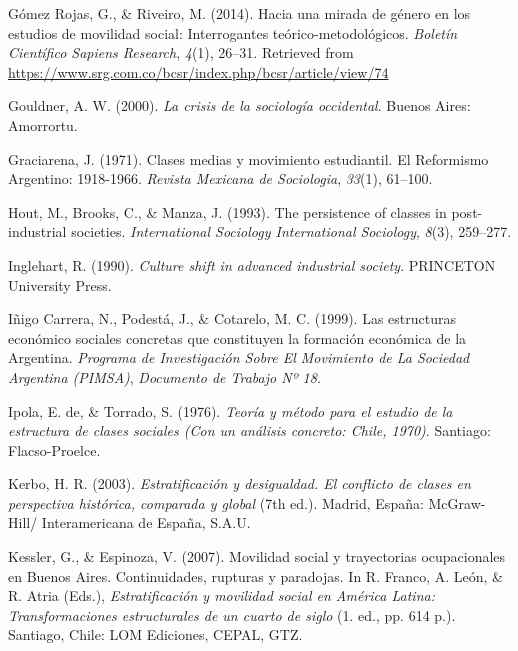 \documentclass[
]{article}
\newlength{\cslhangindent}
\newlength{\cslentryspacingunit} %
\newenvironment{CSLReferences}[2] %
 {%
  \setlength{\parindent}{0pt}
  \ifodd #1
  \let\oldpar\par
  \def\par{\hangindent=\cslhangindent\oldpar}
  \fi
  \setlength{\parskip}{#2\cslentryspacingunit}
 }%
 {}
\begin{document}
\begin{CSLReferences}{1}{0}
\leavevmode{}%
Gómez Rojas, G., \& Riveiro, M. (2014). Hacia una mirada de género en los estudios de movilidad social: Interrogantes teórico-metodológicos. \emph{Boletín Científico Sapiens Research}, \emph{4}(1), 26--31. Retrieved from \url{https://www.srg.com.co/bcsr/index.php/bcsr/article/view/74}

\leavevmode{}%
Gouldner, A. W. (2000). \emph{La crisis de la sociología occidental}. Buenos Aires: Amorrortu.

\leavevmode{}%
Graciarena, J. (1971). Clases medias y movimiento estudiantil. {El} {Reformismo} {Argentino}: 1918-1966. \emph{Revista Mexicana de Sociologia}, \emph{33}(1), 61--100.

\leavevmode{}%
Hout, M., Brooks, C., \& Manza, J. (1993). The persistence of classes in post-industrial societies. \emph{International Sociology International Sociology}, \emph{8}(3), 259--277.

\leavevmode{}%
Inglehart, R. (1990). \emph{Culture shift in advanced industrial society}. PRINCETON University Press.

\leavevmode{}%
Iñigo Carrera, N., Podestá, J., \& Cotarelo, M. C. (1999). Las estructuras económico sociales concretas que constituyen la formación económica de la {Argentina}. \emph{Programa de Investigación Sobre El Movimiento de La Sociedad Argentina (PIMSA)}, \emph{Documento de Trabajo Nº 18}.

\leavevmode{}%
Ipola, E. de, \& Torrado, S. (1976). \emph{Teoría y método para el estudio de la estructura de clases sociales ({Con} un análisis concreto: {Chile}, 1970)}. Santiago: Flacso-Proelce.

\leavevmode{}%
Kerbo, H. R. (2003). \emph{Estratificación y desigualdad. {El} conflicto de clases en perspectiva histórica, comparada y global} (7th ed.). Madrid, España: McGraw-Hill/ Interamericana de España, S.A.U.

\leavevmode{}%
Kessler, G., \& Espinoza, V. (2007). Movilidad social y trayectorias ocupacionales en {Buenos} {Aires}. {Continuidades}, rupturas y paradojas. In R. Franco, A. León, \& R. Atria (Eds.), \emph{Estratificación y movilidad social en {América} {Latina}: Transformaciones estructurales de un cuarto de siglo} (1. ed., pp. 614 p.). Santiago, Chile: LOM Ediciones, CEPAL, GTZ.


\end{CSLReferences}
\end{document}
